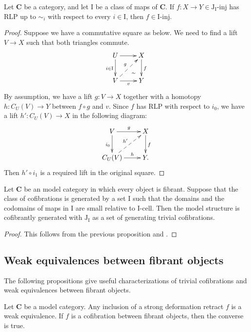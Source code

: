 \documentclass{tac}
\theoremstyle{definition}
\newcommand{\cat}[1]{\mathbf{#1}}
\newcommand{\C}{\cat{C}}
\newcommand{\I}{\mathrm{I}}
\newcommand{\J}{\mathrm{J}}
\newcommand{\class}[2]{#1\text{-}\mathrm{#2}}
\newcommand{\Iinj}[1][\I]{\class{#1}{inj}}
\newcommand{\Icell}[1][\I]{\class{#1}{cell}}
\newcommand{\Jinj}[1][]{\Iinj[\J#1]}
\newcommand{\cyli}{i}
\begin{document}
\begin{prop}
Let $\C$ be a category, and let $\I$ be a class of maps of $\C$.
If $f : X \to Y \in \Jinj[_\I]$ has RLP up to $\sim_i$ with respect to every $i \in \I$, then $f \in \Iinj$.
\end{prop}
\begin{proof}
Suppose we have a commutative square as below.
We need to find a lift $V \to X$ such that both triangles commute.
\[ \xymatrix{ U \ar[d]_{i \in \I} \ar[r] \ar@{}[dr]|(.7){\sim} & X \ar[d]^f \\
              V \ar[r]_v \ar@{-->}[ur]^g                       & Y
            } \]
By assumption, we have a lift $g : V \to X$ together with
a homotopy $h : C_U(V) \to Y$ between $f \circ g$ and $v$.
Since $f$ has RLP with respect to $\cyli_0$, we have a lift $h' : C_U(V) \to X$ in the following diagram:
\[ \xymatrix{ V \ar[r]^g \ar[d]_{\cyli_0}         & X \ar[d]^f \\
              C_U(V) \ar[r]^-h \ar@{-->}[ur]^{h'} & Y.
            } \]
Then $h' \circ \cyli_1$ is a required lift in the original square.
\end{proof}

\begin{cor}
Let $\C$ be an model category in which every object is fibrant.
Suppose that the class of cofibrations is generated by a set $\I$ such that
the domains and the codomains of maps in $\I$ are small relative to $\Icell$.
Then the model structure is cofibrantly generated with $\J_\I$ as a set of generating trivial cofibrations.
\end{cor}
\begin{proof}
This follows from the previous proposition and .
\end{proof}

\subsection{Weak equivalences between fibrant objects}

The following propositions give useful characterizations of trivial
cofibrations and weak equivalences between fibrant objects.

\begin{prop}
Let $\C$ be a model category.
Any inclusion of a strong deformation retract $f$ is a weak equivalence.
If $f$ is a cofibration between fibrant objects, then the converse is true.
\end{prop}
\end{document}
